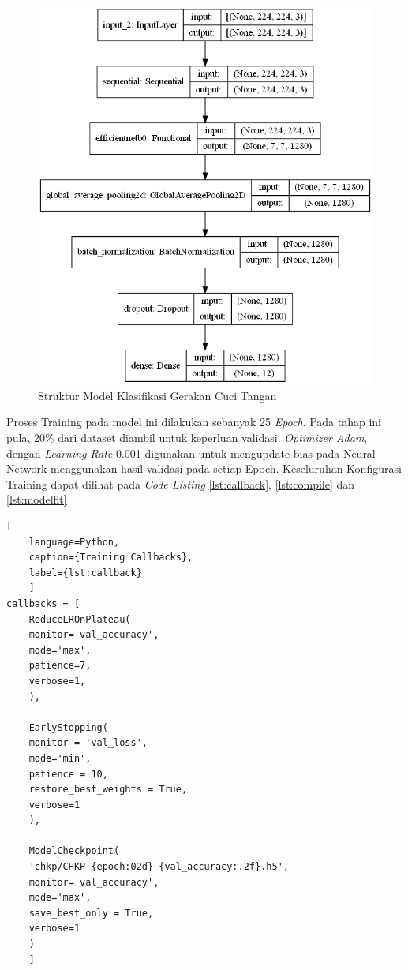 \begin{figure}[!ht]
	\centering
	\includegraphics[width=1\columnwidth]{gambar/modelstructure.png}
	\caption{Struktur Model Klasifikasi Gerakan Cuci Tangan}
	\label{fig:strukturmodel}
\end{figure}

\newpage
Proses Training pada model ini dilakukan sebanyak 25 \textit{Epoch}. Pada tahap ini pula, 20\% dari dataset diambil untuk keperluan validasi. \textit{Optimizer Adam}, dengan \textit{Learning Rate} 0.001 digunakan untuk mengupdate bias pada Neural Network menggunakan hasil validasi pada setiap Epoch. Keseluruhan Konfigurasi Training dapat dilihat pada \textit{Code Listing} \ref{lst:callback}, \ref{lst:compile} dan \ref{lst:modelfit}

\newpage
\begin{lstlisting}[
	language=Python,
	caption={Training Callbacks},
	label={lst:callback}
	]
callbacks = [
	ReduceLROnPlateau(
	monitor='val_accuracy',
	mode='max',
	patience=7, 
	verbose=1,
	),
	
	EarlyStopping(
	monitor = 'val_loss', 
	mode='min',
	patience = 10, 
	restore_best_weights = True,
	verbose=1
	),
	
	ModelCheckpoint(
	'chkp/CHKP-{epoch:02d}-{val_accuracy:.2f}.h5',
	monitor='val_accuracy',
	mode='max',
	save_best_only = True,
	verbose=1
	)
	]
\end{lstlisting} 

